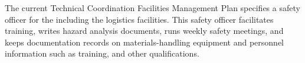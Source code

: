 The current Technical Coordination Facilities Management Plan  specifies a safety officer for the  including the logistics facilities. This safety officer facilitates training, writes hazard analysis documents, runs weekly safety meetings, and keeps documentation records on materials-handling equipment and personnel information such as training,  and other qualifications. 





